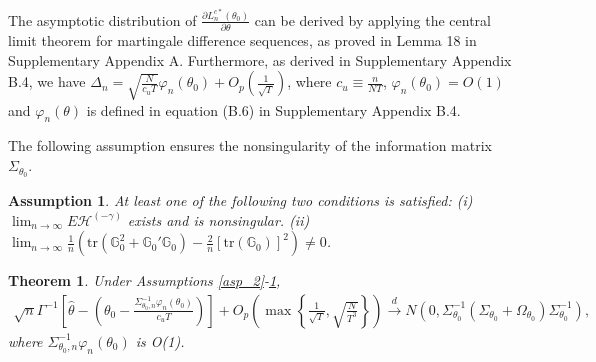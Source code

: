 \documentclass[11pt,a4paper]{article}
\newtheorem{theorem}{Theorem}
\newtheorem{assumption}{Assumption}
\begin{document}
The asymptotic distribution of $\frac{\partial L_n^{c*}(\theta_0)}{\partial\theta}$ can be derived by applying the central limit theorem for martingale difference sequences, as proved in Lemma 18 in Supplementary Appendix A.
Furthermore, as derived in Supplementary Appendix B.4, we have $\Delta_n=\sqrt{\frac{N}{c_uT}}\varphi_n(\theta_0)+O_p\left(\frac{1}{\sqrt{T}}\right)$, where $c_u\equiv\frac{n}{NT}$, $\varphi_n(\theta_0)=O(1)$ and $\varphi_n(\theta)$ is defined in equation (B.6) in Supplementary Appendix B.4.

The following assumption ensures the nonsingularity of the information matrix $\Sigma_{\theta_0}$.
\begin{assumption}\label{asp_nonsingularity} At least one of the following two conditions is satisfied: (i) $\lim_{n\rightarrow\infty}E\mathcal{H}^{(-\gamma)}$ exists and is nonsingular.
(ii) $\lim_{n\rightarrow\infty}\frac{1}{n}\left(\mathrm{tr}(\mathbb{G}_0^2+\mathbb{G}_0'\mathbb{G}_0)-\frac{2}{n}\left[\mathrm{tr}(\mathbb{G}_0)\right]^2\right)\neq0$.
\end{assumption}

\begin{theorem}\label{Normality}
Under Assumptions \ref{asp_2}-\ref{asp_nonsingularity},
\begin{align}
\sqrt{n}\Gamma^{-1}\left[\hat{\theta}-\left(\theta_0-\frac{\Sigma_{\theta_0,n}^{-1}\varphi_n(\theta_0)}{c_uT}\right)\right]+O_p\left(\max\left\{\frac{1}{\sqrt{T}},\sqrt{\frac{N}{T^3}}\right\}\right)\overset{d}{\rightarrow}N\left(0,\Sigma_{\theta_0}^{-1}(\Sigma_{\theta_0}+\Omega_{\theta_0})\Sigma_{\theta_0}^{-1}\right),\label{eq_Normality}
\end{align}
where $\Sigma_{\theta_0,n}^{-1}\varphi_n(\theta_0)$ is O(1).
\end{theorem}
\end{document}
